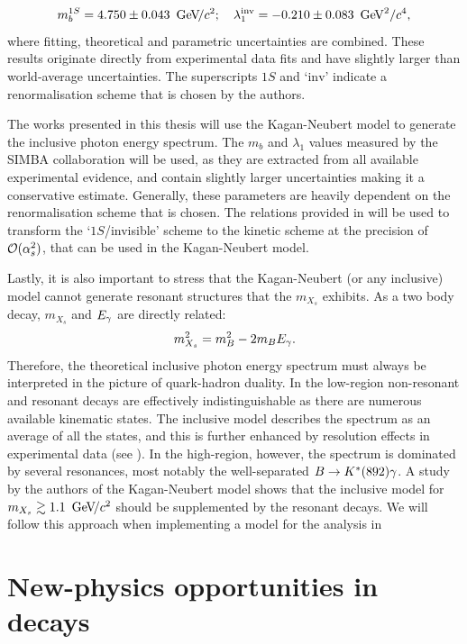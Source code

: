 \begin{equation}\label{eq:simba_result}
    m_b^{1S} =4.750 \pm 0.043~{\mathrm{\,Ge\kern -0.1em V\!/}c^2};  \quad \lambda^{\mathrm{inv}}_1 = -0.210\pm0.083~\mathrm{\,Ge\kern -0.1em V}^2/c^4, 
\end{equation}
where fitting, theoretical and parametric uncertainties are combined.
These results originate directly from experimental data fits and have slightly larger than world-average uncertainties.
The superscripts $1S$ and `$\mathrm{inv}$' indicate a renormalisation scheme that is chosen by the authors.

The works presented in this thesis will use the Kagan-Neubert model to generate the inclusive photon energy spectrum.
The $m_b$ and $\lambda_1$ values measured by the SIMBA collaboration will be used, as they are extracted from all available experimental evidence, and contain slightly larger uncertainties making it a conservative estimate.
Generally, these parameters are heavily dependent on the renormalisation scheme that is chosen.
The relations provided in \cite{Ligeti:2008ac} will be used to transform the `$1S$/invisible' scheme to the kinetic scheme at the precision of ${\cal O}(\alpha_s^2)$, that can be used in the Kagan-Neubert model.

Lastly, it is also important to stress that the Kagan-Neubert (or any inclusive) model cannot generate resonant structures that the $m_{X_s}$ exhibits.
As a two body decay, $m_{X_s}$ and ${E_{\gamma}}$ are directly related:
\begin{equation}
    m_{X_s}^2 = m_B^2 - 2m_B{E_{\gamma}}.
\end{equation}
Therefore, the theoretical inclusive photon energy spectrum must always be interpreted in the picture of quark-hadron duality.
In the low-\Egamma region non-resonant and resonant decays are effectively indistinguishable as there are numerous available kinematic states.
The inclusive model describes the spectrum as an average of all the states, and this is further enhanced by resolution effects in experimental data (see ).
In the high-\Egamma region, however, the spectrum is dominated by several resonances, most notably the well-separated $B\rightarrow K^*(892)\gamma$.
A study by the authors of the Kagan-Neubert model \cite{Kagan:1998ym} shows that the inclusive model for $m_{X_s}\gtrsim 1.1~{\mathrm{\,Ge\kern -0.1em V\!/}c^2}$ should be supplemented by the resonant decays.
We will follow this approach when implementing a model for the analysis in 

\section{New-physics opportunities in \safeBtoXsgamma decays}\label{sec:btosgamma_bsm}

